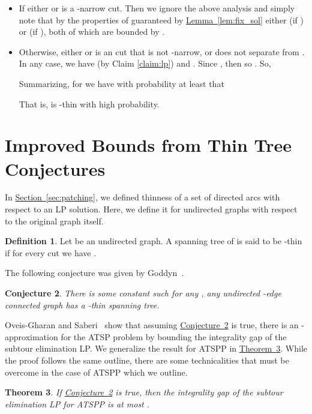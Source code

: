\documentclass[11pt]{article}
\newcommand{\lref}[2][]{\hyperref[#2]{#1~\ref*{#2}}}
\newtheorem{theorem}{Theorem}[section]
\newtheorem{conjecture}[theorem]{Conjecture}
\theoremstyle{definition}
\newtheorem{definition}[theorem]{Definition}
\newcounter{note}[section]
\begin{document}
\begin{itemize}
\item If either  or  is a -narrow  cut. Then we ignore the above analysis and simply note that by the properties of  guaranteed by \lref[Lemma]{lem:fix_sol}
either  (if ) or  (if ), both of which are bounded by .
\item Otherwise, either  or  is an  cut that is not -narrow, or  does not separate  from . In any case, we have
 (by Claim \ref{claim:lp}) and .
Since , then  so . So,

Summarizing, for  we have with probability at least  that

That is,  is -thin with high probability.

\end{itemize}

\section{Improved Bounds from Thin Tree Conjectures}
\label{sec:thin}



In \lref[Section]{sec:patching}, we defined thinness of a set of directed arcs with respect to an LP solution. Here, we define it for undirected graphs
with respect to the original graph itself.
\begin{definition}
Let  be an undirected graph. A spanning tree  of  is said to be -thin if for every cut 
we have .
\end{definition}

The following conjecture was given by Goddyn~\cite{goddyn}.
\begin{conjecture}\label{conj:thin}
There is some constant  such for any , any undirected -edge connected graph has a -thin spanning tree.
\end{conjecture}

Oveis-Gharan and Saberi~\cite{GS11} show that assuming \lref[Conjecture]{conj:thin} is true, there is an -approximation for the ATSP problem by bounding the integrality gap of the subtour elimination LP. We generalize the result for ATSPP in \lref[Theorem]{thm:thin}. While the proof follows the same outline,  there are some technicalities that must be overcome in the case of ATSPP which we outline.

\begin{theorem}\label{thm:thin}
If \lref[Conjecture]{conj:thin} is true, then the integrality gap of the subtour elimination LP for ATSPP is at most .
\end{theorem}
\end{document}
